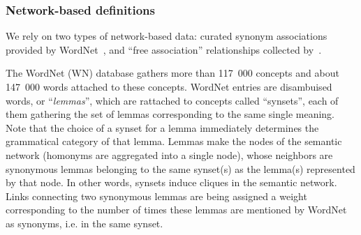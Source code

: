 \subsubsection{Network-based definitions}
We rely on two types of network-based data: curated synonym associations provided by WordNet~\citep{WordNet10}, and ``free association'' relationships collected by~\citep{Nelson04}.  

The WordNet (WN) database gathers more than 117~000 concepts and about 147~000 words attached to these concepts. WordNet entries are disambuised words, or ``\emph{lemmas}'', which are rattached to concepts called ``synsets'', each of them gathering the set of lemmas corresponding to the same single meaning. Note that the choice of a synset for a lemma immediately determines the grammatical category of that lemma. Lemmas make the nodes of the semantic network (homonyms are aggregated into a single node), whose neighbors are synonymous lemmas belonging to the same synset(s) as the lemma(s) represented by that node.  In other words, synsets induce cliques in the semantic network. Links connecting two synonymous lemmas are being assigned a weight corresponding to the number of times these lemmas are mentioned by WordNet as synonyms, i.e. in the same synset. 



